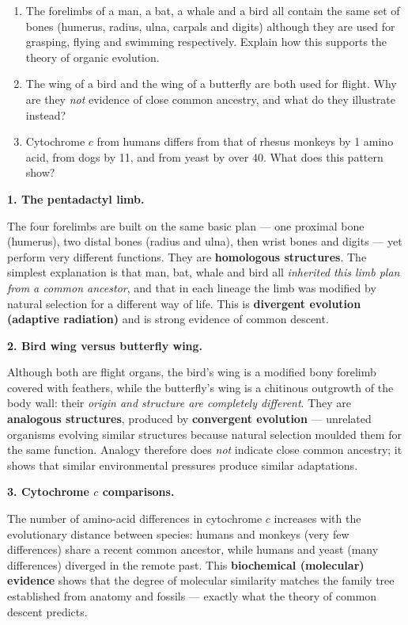 \documentclass[11pt]{article}
\begin{document}
\begin{exoresolu}
\begin{enumerate}
\item The forelimbs of a man, a bat, a whale and a bird all contain the same set of bones (humerus, radius, ulna, carpals and digits) although they are used for grasping, flying and swimming respectively. Explain how this supports the theory of organic evolution.
\item The wing of a bird and the wing of a butterfly are both used for flight. Why are they \emph{not} evidence of close common ancestry, and what do they illustrate instead?
\item Cytochrome $c$ from humans differs from that of rhesus monkeys by 1 amino acid, from dogs by 11, and from yeast by over 40. What does this pattern show?
\end{enumerate}
\tcblower
\textbf{1. The pentadactyl limb.}

The four forelimbs are built on the same basic plan — one proximal bone (humerus), two distal bones (radius and ulna), then wrist bones and digits — yet perform very different functions. They are \textbf{homologous structures}. The simplest explanation is that man, bat, whale and bird all \emph{inherited this limb plan from a common ancestor}, and that in each lineage the limb was modified by natural selection for a different way of life. This is \textbf{divergent evolution (adaptive radiation)} and is strong evidence of common descent.

\textbf{2. Bird wing versus butterfly wing.}

Although both are flight organs, the bird's wing is a modified bony forelimb covered with feathers, while the butterfly's wing is a chitinous outgrowth of the body wall: their \emph{origin and structure are completely different}. They are \textbf{analogous structures}, produced by \textbf{convergent evolution} — unrelated organisms evolving similar structures because natural selection moulded them for the same function. Analogy therefore does \emph{not} indicate close common ancestry; it shows that similar environmental pressures produce similar adaptations.

\textbf{3. Cytochrome $c$ comparisons.}

The number of amino-acid differences in cytochrome $c$ increases with the evolutionary distance between species: humans and monkeys (very few differences) share a recent common ancestor, while humans and yeast (many differences) diverged in the remote past. This \textbf{biochemical (molecular) evidence} shows that the degree of molecular similarity matches the family tree established from anatomy and fossils — exactly what the theory of common descent predicts.
\end{exoresolu}
\end{document}
